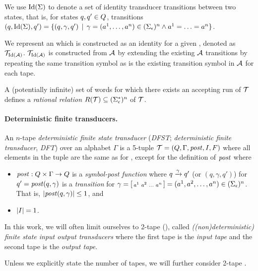 We use $\text{Id}(\Sigma)$ to denote a set of identity transducer transitions between two states, that is, for states $q, q' \in Q$, transitions
$(q, \text{Id}(\Sigma), q') = \{ (q, \gamma, q') \,\mid\, \gamma = (a^1, \ldots, a^n) \in (\Sigma_\epsilon)^n \land a^1 = \ldots = a^n \}$.

We represent an \nft which is constructed as an identity \nft for a given \nfa, denoted as $\mathcal{T}_{\text{Id}(\mathcal{A})}$.
$\mathcal{T}_{\text{Id}(\mathcal{A})}$ is constructed from $\mathcal{A}$ by extending the existing $\mathcal{A}$ transitions by repeating the same transition symbol as is the existing transition symbol in $\mathcal{A}$ for each tape.

A (potentially infinite) set of words for which there exists an accepting run of $\mathcal{T}$ defines a \emph{rational relation} $R(\mathcal{T}) \subseteq (\Sigma_\epsilon^*)^n$ of \nft $\mathcal{T}$.

\paragraph{Deterministic finite transducers.}
An $n$-tape \emph{deterministic finite state transducer} (\emph{DFST}; \emph{deterministic finite transducer}, \emph{DFT}) over an alphabet $\Gamma$ is a 5-tuple $\mathcal{T} = (Q, \Gamma, \mathit{post}, I, F)$ where all elements in the tuple are the same as for \nft, except for the definition of $\mathit{post}$ where
\begin{itemize}
    \item $\mathit{post}: Q \times \Gamma \rightarrow Q$ is a \emph{symbol-post function} where ${q} \xrightarrow{{\gamma}} {q'}$ (or $(q, \gamma, q')$) for $q' = \mathit{post}(q, \gamma)$ is a \emph{transition} for $\gamma = \begin{bsmallmatrix} a^1 & a^2 & \ldots & a^n\end{bsmallmatrix} = (a^1, a^2, \ldots, a^n) \in (\Sigma_\epsilon)^n$. That is, $|\mathit{post}(q, \gamma)| \leq 1$, and
    \item $|I| = 1$.
\end{itemize}


In this work, we will often limit ourselves to 2-tape \nfts (\dfts), called \emph{((non)deterministic) finite state input output transducers} where the first tape is the \emph{input tape} and the second tape is the \emph{output tape}.

Unless we explicitly state the number of tapes, we will further consider 2-tape \nfts.


